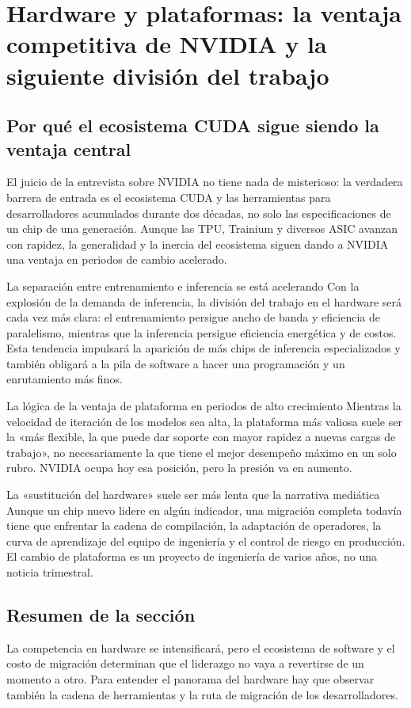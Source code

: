 \section{Hardware y plataformas: la ventaja competitiva de NVIDIA y la siguiente división del trabajo}

\subsection{Por qué el ecosistema CUDA sigue siendo la ventaja central}

El juicio de la entrevista sobre NVIDIA no tiene nada de misterioso: la verdadera barrera de entrada es el ecosistema CUDA y las herramientas para desarrolladores acumulados durante dos décadas, no solo las especificaciones de un chip de una generación. Aunque las TPU, Trainium y diversos ASIC avanzan con rapidez, la generalidad y la inercia del ecosistema siguen dando a NVIDIA una ventaja en periodos de cambio acelerado.

\begin{knowledgebox}{La separación entre entrenamiento e inferencia se está acelerando}
Con la explosión de la demanda de inferencia, la división del trabajo en el hardware será cada vez más clara: el entrenamiento persigue ancho de banda y eficiencia de paralelismo, mientras que la inferencia persigue eficiencia energética y de costos. Esta tendencia impulsará la aparición de más chips de inferencia especializados y también obligará a la pila de software a hacer una programación y un enrutamiento más finos.
\end{knowledgebox}

\begin{importantbox}{La lógica de la ventaja de plataforma en periodos de alto crecimiento}
Mientras la velocidad de iteración de los modelos sea alta, la plataforma más valiosa suele ser la «más flexible, la que puede dar soporte con mayor rapidez a nuevas cargas de trabajo», no necesariamente la que tiene el mejor desempeño máximo en un solo rubro. NVIDIA ocupa hoy esa posición, pero la presión va en aumento.
\end{importantbox}

\begin{warningbox}{La «sustitución del hardware» suele ser más lenta que la narrativa mediática}
Aunque un chip nuevo lidere en algún indicador, una migración completa todavía tiene que enfrentar la cadena de compilación, la adaptación de operadores, la curva de aprendizaje del equipo de ingeniería y el control de riesgo en producción. El cambio de plataforma es un proyecto de ingeniería de varios años, no una noticia trimestral.
\end{warningbox}

\subsection{Resumen de la sección}

La competencia en hardware se intensificará, pero el ecosistema de software y el costo de migración determinan que el liderazgo no vaya a revertirse de un momento a otro. Para entender el panorama del hardware hay que observar también la cadena de herramientas y la ruta de migración de los desarrolladores.

